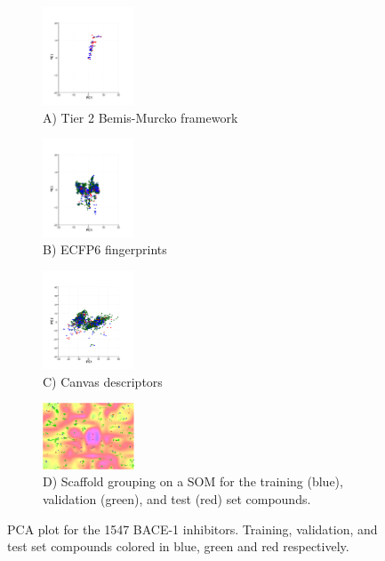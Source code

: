 \begin{figure}
\centering
\begin{subfigure}
  \centering
  \includegraphics[width=0.3\textwidth]{Images/bace_figA.png}
  \caption{A)  Tier 2 Bemis-Murcko framework}
  \label{fig:bace_1A}
\end{subfigure}
\begin{subfigure}
  \centering
  \includegraphics[width=0.3\textwidth]{Images/bace_figB.png}
  \caption{B) ECFP6 fingerprints}
  \label{fig:bace_1B}
\end{subfigure}
\begin{subfigure}
  \centering
  \includegraphics[width=0.3\textwidth]{Images/bace_figC.png}
  \caption{C) Canvas descriptors}
  \label{fig:bace_1C}
\end{subfigure}
\begin{subfigure}
  \centering
  \includegraphics[width=0.3\textwidth]{Images/bace_fig1D.png}
  \caption{ D) Scaffold grouping on a SOM for the training (blue), validation (green), and test (red) set compounds.}
  \label{fig:bace_1D}
\end{subfigure}
\caption{PCA plot for the 1547 BACE-1 inhibitors.  Training, validation, and test set compounds colored in blue, green and red respectively.}
\label{fig:bace_1}
\end{figure}

